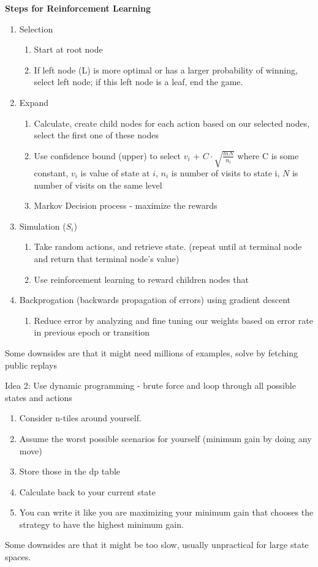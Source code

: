\documentclass{article}
\begin{document}
\textbf{Steps for Reinforcement Learning}
\begin{enumerate}
\item Selection
\begin{enumerate}
\item Start at root node
\item If left node (L) is more optimal or has a larger probability of winning, select left node; if this left node is a leaf, end the game.
\end{enumerate}


\item Expand
\begin{enumerate}
\item Calculate, create child nodes for each action based on our selected nodes, select the first one of these nodes
\item Use confidence bound (upper) to select  $v_i$ + $C \cdot \sqrt{\frac{ln N}{n_i}}$ where C is some constant, $v_i$ is value of state at $i$, $n_i$ is number of visits to state i, $N$ is number of visits on the same level
\item Markov Decision process - maximize the rewards
\end{enumerate}

\item Simulation ($S_i$)
\begin{enumerate}
\item Take random actions, and retrieve state. (repeat until at terminal node and return that terminal node's value)
\item Use reinforcement learning to reward children nodes that 
\end{enumerate}

\item Backprogation (backwards propagation of errors) using gradient descent
\begin{enumerate}
\item Reduce error by analyzing and fine tuning our weights based on error rate in previous epoch or transition
\end{enumerate}
\end{enumerate}
Some downsides are that it might need millions of examples, solve by fetching public replays

Idea 2: Use dynamic programming - brute force and loop through all possible states and actions 
\begin{enumerate}
\item Consider n-tiles around yourself.
\item Assume the worst possible scenarios for yourself (minimum gain by doing any move)
\item Store those in the dp table
\item Calculate back to your current state
\item You can write it like you are maximizing your minimum gain that chooses the strategy to have the highest minimum gain.
\end{enumerate}
Some downsides are that it might be too slow, usually unpractical for large state spaces.
\end{document}
